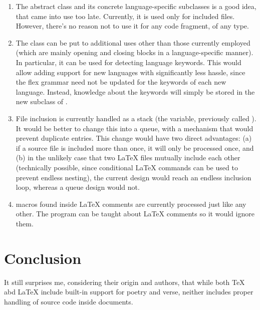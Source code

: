 \documentclass[twoside,12pt]{article}
\begin{document}
\begin{enumerate}

\item
The abstract \PROGfg{} class and its concrete language-specific subclasses is a good
    idea, that came into use too late.
Currently, it is used only for included files.
However, there's no reason not to use it for any code fragment, of any type.

\item
The \PROGfh{} class can be put to additional uses other than those currently employed
    (which are mainly opening and closing blocks in a language-specific manner).
In particular, it can be used for detecting language keywords.
This would allow adding support for new languages with significantly less hassle, since
    the flex grammar need not be updated for the keywords of each new language.
Instead, knowledge about the keywords will simply be stored in the new subclass of
    \PROGfi{}.

\item
File inclusion is currently handled as a stack (the \PROGfj{} variable, previously
    called \PROGga{}).
It would be better to change this into a queue, with a mechanism that would prevent
    duplicate entries.
This change would have two direct advantages:
(a) if a source file is included more than once, it will only be processed once, and
(b) in the unlikely case that two \LaTeX{} files mutually include each other (technically
    possible, since conditional \LaTeX{} commands can be used to prevent endless nesting),
    the current design would reach an endless inclusion loop, whereas a
    queue design would not.

\item
\progtex{} macros found inside \LaTeX{} comments are currently processed just like any
    other.
The program can be taught about \LaTeX{} comments so it would ignore them.

\end{enumerate}

\section{Conclusion}
\label{Section:Conclusion}

It still surprises me, considering their origin and authors, that while both
    \TeX{} abd \LaTeX{} include built-in support for poetry and verse, neither includes
    proper handling of source code inside documents.
\end{document}
